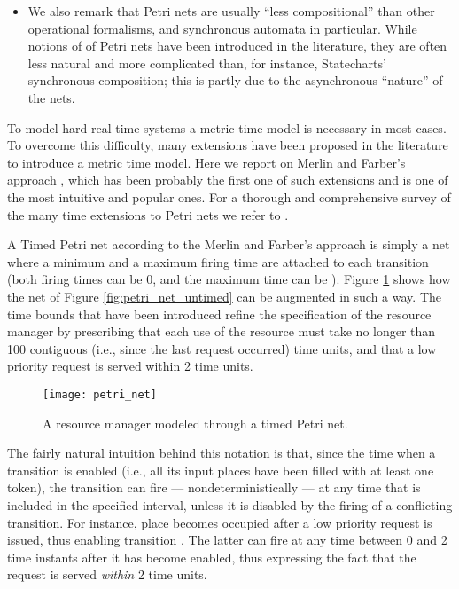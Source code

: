 \begin{itemize}
\item We also remark that Petri nets are usually ``less compositional'' 
than other operational formalisms, and synchronous automata in 
particular. While notions of  of Petri nets have been 
introduced in the literature, they are often less natural and 
more complicated than, for instance, Statecharts' synchronous 
composition; this is partly due to the asynchronous ``nature'' 
of the nets. 
\end{itemize}

To model hard real-time systems a metric time model is necessary in
most cases. To overcome this difficulty, many extensions have been
proposed in the literature to introduce a metric time model. Here we
report on Merlin and Farber's approach \cite{MF76}, which has been
probably the first one of such extensions and is one of the most
intuitive and popular ones.  For a thorough and comprehensive survey
of the many time extensions to Petri nets we refer to
\cite{CM99,Cer93}.

A Timed Petri net according to the Merlin and Farber's approach is
simply a net where a minimum and a maximum firing time are attached to
each transition (both firing times can be 0, and the maximum time can
be ). Figure \ref{fig:petri_net} shows how the net of Figure
\ref{fig:petri_net_untimed} can be augmented in such a way. The time
bounds that have been introduced refine the specification of the
resource manager by prescribing that each use of the resource must
take no longer than 100 contiguous (i.e., since the last request
occurred) time units, and that a low priority request is served within
2 time units.
\begin{figure}[htb!]
	 \centering
	 \texttt{[image: petri\_net]}
	 \caption{A resource manager modeled through a timed Petri net.}
	 \label{fig:petri_net}
\end{figure}

The fairly natural intuition behind this notation is that, since the
time when a transition is enabled (i.e., all its input places have
been filled with at least one token), the transition can fire ---
nondeterministically --- at any time that is included in the specified
interval, unless it is disabled by the firing of a conflicting
transition. For instance, place  becomes occupied after a low
priority request is issued, thus enabling transition . The
latter can fire at any time between 0 and 2 time instants after it has
become enabled, thus expressing the fact that the request is served
\emph{within} 2 time units.


